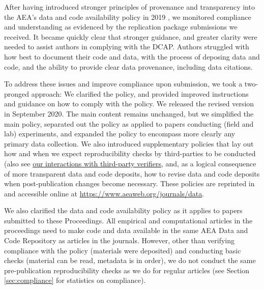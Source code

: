 \documentclass[PP]{AEA}
\begin{document}
After having introduced stronger principles of provenance and transparency into the  \ac{AEA}'s data and code availability policy in 2019 \citep{10.1257/pandp.110.dcap}, we monitored compliance and understanding as evidenced by the replication package submissions we received. It became quickly clear that stronger guidance, and greater clarity were needed to assist authors in complying with the \ac{DCAP}. Authors struggled with how best to document their code and data,  with the process of deposing data and code, and the ability to provide clear data provenance, including  data citations. 

To address these issues and improve compliance upon submission, we took a two-pronged approach: We clarified the policy, and provided improved instructions and guidance on how to comply with the policy. We released the revised version in September 2020. The main content remains unchanged, but we simplified the main policy,  separated out the policy as applied to papers conducting (field and lab) experiments, and expanded the policy to encompass more clearly any primary data collection. We also introduced  supplementary policies that lay out how and when we expect reproducibility checks by third-parties to be conducted (also see \hyperref[sec:3rdparty]{our interactions with third-party verifiers}, and, as a logical consequence of more transparent data and code deposits, how to revise data and code deposits when post-publication changes become necessary. These policies are reprinted in \citet{10.1257/pandp.111.dcap} and accessible online at \url{https://www.aeaweb.org/journals/data}.

We also clarified the data and code availability policy as it applies to papers submitted to these Proceedings. All empirical and computational articles in the proceedings need to make code and data available in the same AEA Data and Code Repository as articles in the journals. However, other than verifying compliance with the policy (materials were deposited) and conducting basic checks (material can be read, metadata is in order), we do not conduct the same pre-publication reproducibility checks as we do for regular articles (see Section \ref{sec:compliance} for statistics on compliance).
\end{document}
